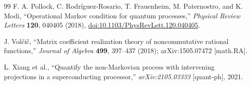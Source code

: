 \begin{thebibliography}{99}
F. A. Pollock, C. Rodr\'iguez-Rosario, T. Frauenheim, M. Paternostro, and K. Modi,
``Operational Markov condition for quantum processes,''
\emph{Physical Review Letters} \textbf{120}, 040405 (2018),
\href{https://doi.org/10.1103/PhysRevLett.120.040405}{doi:10.1103/PhysRevLett.120.040405}.

J. Vol\v{c}i\v{c},
``Matrix coefficient realization theory of noncommutative rational functions,''
\emph{Journal of Algebra} \textbf{499}, 397--437 (2018); arXiv:1505.07472 [math.RA].

L. Xiang et al.,
``Quantify the non-Markovian process with intervening projections in a superconducting processor,''
\emph{arXiv:2105.03333} [quant-ph], 2021.

\end{thebibliography}
